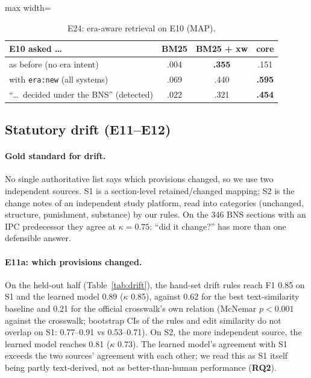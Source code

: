 \documentclass[sigconf,nonacm]{acmart}
\begin{document}
\begin{table}[t]
\centering\small
\caption{E24: era-aware retrieval on E10 (MAP).}
\label{tab:era}
\begin{adjustbox}{max width=\linewidth}
\begin{tabular}{lccc}
\toprule
E10 asked \ldots & BM25 & BM25 + xw & core \\
\midrule
as before (no era intent) & .004 & \textbf{.355} & .151 \\
with \texttt{era:new} (all systems) & .069 & .440 & \textbf{.595} \\
``\ldots\ decided under the BNS'' (detected) & .022 & .321 & \textbf{.454} \\
\bottomrule
\end{tabular}
\end{adjustbox}
\end{table}

\subsection{Statutory drift (E11--E12)}\label{sec:res-drift}

\paragraph{Gold standard for drift.} No single authoritative list says which provisions changed,
so we use two independent sources. S1 is a section-level retained/changed mapping; S2 is the change notes of an
independent study platform, read into categories (unchanged, structure, punishment, substance) by
our rules. On the 346 BNS sections with an IPC predecessor they agree at $\kappa=0.75$: ``did it
change?'' has more than one defensible answer.

\paragraph{E11a: which provisions changed.} On the held-out half (Table~\ref{tab:drift}), the
hand-set drift rules reach F1 0.85 on S1 and the learned model 0.89 ($\kappa$ 0.85), against 0.62
for the best text-similarity baseline and 0.21 for the official crosswalk's own relation (McNemar
$p<0.001$ against the crosswalk; bootstrap CIs of the rules and edit similarity do not overlap on
S1: 0.77--0.91 vs 0.53--0.71). On S2, the more independent source, the learned model reaches 0.81
($\kappa$ 0.73). The learned model's agreement with S1 exceeds the two sources' agreement with each
other; we read this as S1 itself being partly text-derived, not as better-than-human performance
(\textbf{RQ2}).
\end{document}
